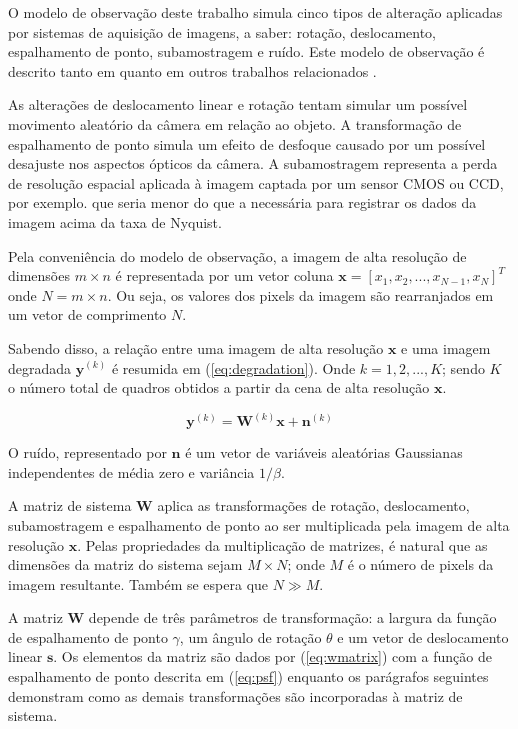 \documentclass[12pt,openright,oneside,a4paper,english,brazil]{abntex2}
\begin{document}
O modelo de observação deste trabalho simula cinco tipos de alteração aplicadas por sistemas de aquisição de imagens, a saber: rotação, deslocamento, espalhamento de ponto, subamostragem e ruído.
Este modelo de observação é descrito tanto em \cite{tipping2003bayesian} quanto em outros trabalhos relacionados \cite{pickup2007bayesian, Capel01a}.

As alterações de deslocamento linear e rotação tentam simular um possível movimento aleatório da câmera em relação ao objeto.
A transformação de espalhamento de ponto simula um efeito de desfoque causado por um possível desajuste nos aspectos ópticos da câmera.
A subamostragem representa a perda de resolução espacial aplicada à imagem captada por um sensor CMOS ou CCD, por exemplo.
que seria menor do que a necessária para registrar os dados da imagem acima da taxa de Nyquist.

Pela conveniência do modelo de observação, a imagem de alta resolução de dimensões $m \times n$ é representada por um vetor coluna $\mathbf{x} = [x_1, x_2, ... , x_{N-1}, x_N]^T$ onde $N ={} m \times n$. Ou seja, os valores dos pixels da imagem são rearranjados em um vetor de comprimento $N$.

Sabendo disso, a relação entre uma imagem de alta resolução $\mathbf{x}$ e uma imagem degradada $\mathbf{y}^{(k)}$ é resumida em (\ref{eq:degradation}). Onde $k = 1,2,...,K$; sendo $K$ o número total de quadros obtidos a partir da cena de alta resolução $\mathbf{x}$.

\begin{equation}
	\label{eq:degradation}
	\mathbf{y}^{(k)} = \mathbf{W}^{(k)}\mathbf{x} + \mathbf{n}^{(k)}
\end{equation}

O ruído, representado por $\mathbf{n}$ é um vetor de variáveis aleatórias Gaussianas independentes de média zero e variância $1/\beta$.

A matriz de sistema $\mathbf{W}$ aplica as transformações de rotação, deslocamento, subamostragem e espalhamento de ponto ao ser multiplicada pela imagem de alta resolução $\mathbf{x}$.
Pelas propriedades da multiplicação de matrizes, é natural que as dimensões da matriz do sistema sejam $M \times N$; onde $M$ é o número de pixels da imagem resultante.
Também se espera que $N \gg M$.

A matriz $\mathbf{W}$ depende de três parâmetros de transformação: a largura da função de espalhamento de ponto $\gamma$, um ângulo de rotação $\theta$ e um vetor de deslocamento linear $\mathbf{s}$.
Os elementos da matriz são dados por (\ref{eq:wmatrix}) com a função de espalhamento de ponto descrita em (\ref{eq:psf}) enquanto os parágrafos seguintes demonstram como as demais transformações são incorporadas à matriz de sistema.
\end{document}
